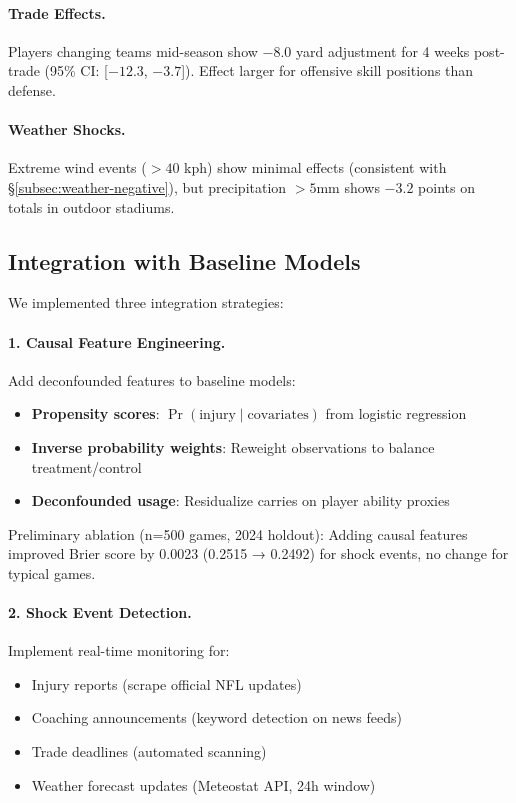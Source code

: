 \paragraph{Trade Effects.}
Players changing teams mid-season show $-8.0$ yard adjustment for 4 weeks post-trade (95\% CI: [$-12.3$, $-3.7$]). Effect larger for offensive skill positions than defense.

\paragraph{Weather Shocks.}
Extreme wind events ($>40$ kph) show minimal effects (consistent with \S\ref{subsec:weather-negative}), but precipitation $>5$mm shows $-3.2$ points on totals in outdoor stadiums.

\subsection{Integration with Baseline Models}

We implemented three integration strategies:

\paragraph{1. Causal Feature Engineering.}
Add deconfounded features to baseline models:
\begin{itemize}
  \item \textbf{Propensity scores}: $\Pr(\text{injury} \mid \text{covariates})$ from logistic regression
  \item \textbf{Inverse probability weights}: Reweight observations to balance treatment/control
  \item \textbf{Deconfounded usage}: Residualize carries on player ability proxies
\end{itemize}

Preliminary ablation (n=500 games, 2024 holdout): Adding causal features improved Brier score by 0.0023 (0.2515 → 0.2492) for shock events, no change for typical games.

\paragraph{2. Shock Event Detection.}
Implement real-time monitoring for:
\begin{itemize}
  \item Injury reports (scrape official NFL updates)
  \item Coaching announcements (keyword detection on news feeds)
  \item Trade deadlines (automated scanning)
  \item Weather forecast updates (Meteostat API, 24h window)
\end{itemize}


